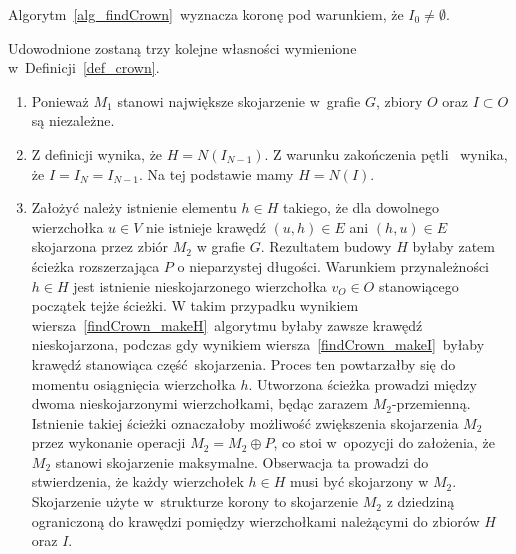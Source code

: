 \begin{theorem}
  Algorytm~\ref{alg_findCrown}\ wyznacza koronę pod warunkiem, że $I_0\neq\emptyset$.
\end{theorem}
\begin{bproof} Udowodnione zostaną trzy kolejne własności wymienione w~Definicji~\ref{def_crown}.
  \begin{enumerate}
    \item Ponieważ $M_1$ stanowi największe skojarzenie w~grafie $G$, zbiory $O$ oraz $I \subset O$ są niezależne.
    \item  Z definicji wynika, że $H=N(I_{N-1})$.
      Z warunku zakończenia pętli~ wynika, że $I=I_N=I_{N-1}$.
      Na tej podstawie mamy $H=N(I)$.
    \item Założyć należy istnienie elementu $h \in H$ takiego, że dla dowolnego wierzchołka $u \in V$ nie istnieje krawędź $(u, h) \in E$ ani $(h, u) \in E$ skojarzona przez zbiór $M_2$ w grafie $G$.
    Rezultatem budowy $H$ byłaby zatem ścieżka rozszerzająca $P$ o nieparzystej długości. 
    Warunkiem przynależności $h \in H$ jest istnienie nieskojarzonego wierzchołka $v_O \in O$ stanowiącego początek tejże ścieżki.
    W takim przypadku wynikiem wiersza~\ref{findCrown_makeH}\ algorytmu byłaby zawsze krawędź nieskojarzona, podczas gdy wynikiem wiersza~\ref{findCrown_makeI}\ byłaby krawędź stanowiąca część~skojarzenia.
    Proces ten powtarzałby się do momentu osiągnięcia wierzchołka $h$.
    Utworzona ścieżka prowadzi między dwoma nieskojarzonymi wierzchołkami, będąc zarazem $M_2$-przemienną.
    Istnienie takiej ścieżki oznaczałoby możliwość zwiększenia skojarzenia $M_2$ przez wykonanie operacji $M_2=M_2\oplus P$, co stoi w~opozycji do założenia, że $M_2$ stanowi skojarzenie maksymalne.
    Obserwacja ta prowadzi do stwierdzenia, że każdy wierzchołek $h \in H$ musi być skojarzony w $M_2$.
    Skojarzenie użyte w~strukturze korony to skojarzenie $M_2$ z dziedziną ograniczoną do krawędzi pomiędzy wierzchołkami należącymi do zbiorów $H$ oraz $I$.
  \end{enumerate}
\end{bproof}
